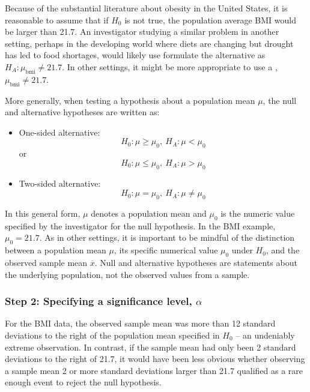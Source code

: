 \begin{spacing}{1.5}
 Because of the substantial literature about obesity in the United States, it is reasonable to assume that if $H_0$ is not true, the population average BMI would be larger than 21.7.  An investigator studying a similar problem in another setting, perhaps in the developing world where diets are changing but drought has led to food shortages, would likely use formulate the alternative as $ H_A:\mu_{\text{bmi}} \ne 21.7$. In other settings, it might be more appropriate to use a , $\mu_{\text{bmi}} \neq 21.7$. %

More generally, when testing a hypothesis about a population mean $\mu$, the null and alternative hypotheses are written as:

\begin{itemize}
	\item One-sided alternative: \[H_0: \mu \geq \mu_0, \ H_A: \mu < \mu_0\] or \[H_0: \mu \leq \mu_0, \  H_A: \mu > \mu_0\]
	
	\item Two-sided alternative: \[H_0: \mu = \mu_0, \ H_A: \mu \neq \mu_0\]
\end{itemize}


In this general form, $\mu$ denotes a population mean and $\mu_0$ is the numeric value specified by the investigator for the null hypothesis. In the BMI example, $\mu_0 = 21.7$.  As in other settings, it is important to be mindful of the distinction between a population mean $\mu$, its specific numerical value $\mu_0$ under $H_0$,  and the observed sample mean $\overline{x}$.  Null and alternative hypotheses are statements about the underlying population, not the observed values from a sample.

\subsubsection{Step 2: Specifying a significance level, $\alpha$}

For the  BMI data, the observed sample mean was more than 12 standard deviations to the right of the population mean specified in $H_0$ -- an undeniably extreme observation. In contrast, if the sample mean had only been 2 standard deviations to the right of 21.7, it would have been less obvious whether observing a sample mean 2 or more standard deviations larger than 21.7 qualified as a rare enough event to reject the null hypothesis. 


\end{spacing}
